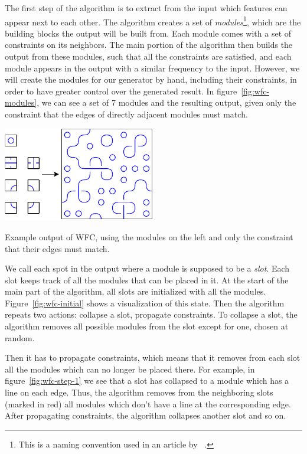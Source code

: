 The first step of the algorithm is to extract from the input which features can appear next to each other.
The algorithm creates a set of \emph{modules}\footnote{This is a naming convention used in an article by ~\cite{WFCMarian}.}, which are the building blocks the output will be built from.
Each module comes with a set of constraints on its neighbors.
The main portion of the algorithm then builds the output from these modules, such that all the constraints are satisfied, and each module appears in the output with a similar frequency to the input.
However, we will create the modules for our generator by hand, including their constraints, in order to have greater control over the generated result.
In figure~\ref{fig:wfc-modules}, we can see a set of 7 modules and the resulting output, given only the constraint that the edges of directly adjacent modules must match.

\begin{center}
    \captionsetup{type=figure}
    \includegraphics[width=0.5\textwidth]{img/WFC modules.pdf}
    \caption{Example output of WFC, using the modules on the left and only the constraint that their edges must match.}
    \label{fig:wfc-modules}
\end{center}

We call each spot in the output where a module is supposed to be a \emph{slot}.
Each slot keeps track of all the modules that can be placed in it.
At the start of the main part of the algorithm, all slots are initialized with all the modules.
Figure~\ref{fig:wfc-initial} shows a visualization of this state.
Then the algorithm repeats two actions: collapse a slot, propagate constraints.
To collapse a slot, the algorithm removes all possible modules from the slot except for one, chosen at random.

Then it has to propagate constraints, which means that it removes from each slot all the modules which can no longer be placed there.
For example, in figure~\ref{fig:wfc-step-1} we see that a slot has collapsed to a module which has a line on each edge.
Thus, the algorithm removes from the neighboring slots (marked in red) all modules which don't have a line at the corresponding edge.
After propagating constraints, the algorithm collapses another slot and so on.

